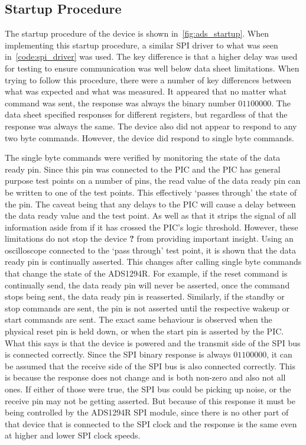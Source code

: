 \subsection{Startup Procedure}
The startup procedure of the device is shown in~\autoref{fig:ads_startup}.
When implementing this startup procedure, a similar SPI driver to what was seen in~\autoref{code:spi_driver} was used.
The key difference is that a higher delay was used for testing to ensure communication was well below data sheet limitations.
When trying to follow this procedure, there were a number of key differences between what was expected and what was measured.
It appeared that no matter what command was sent, the response was always the binary number \(01100000\).
The data sheet specified responses for different registers, but regardless of that the response was always the same.
The device also did not appear to respond to any two byte commands.
However, the device did respond to single byte commands.

The single byte commands were verified by monitoring the state of the data ready pin.
Since this pin was connected to the PIC and the PIC has general purpose test points on a number of pins,
the read value of the data ready pin can be written to one of the test points.
This effectively `passes through' the state of the pin.
The caveat being that any delays to the PIC will cause a delay between the data ready value and the test point.
As well as that it strips the signal of all information aside from if it has crossed the PIC's logic threshold.
However, these limitations do not stop the device \textbf{?} from providing important insight.
Using an oscilloscope connected to the `pass through' test point, it is shown that the data ready pin is continually asserted.
This changes after calling single byte commands that change the state of the ADS1294R.
For example, if the reset command is continually send, the data ready pin will never be asserted,
once the command stops being sent, the data ready pin is reasserted.
Similarly, if the standby or stop commands are sent, the pin is not asserted until the respective wakeup or start commands are sent.
The exact same behaviour is observed when the physical reset pin is held down, or when the start pin is asserted by the PIC.
What this says is that the device is powered and the transmit side of the SPI bus is connected correctly.
Since the SPI binary response is always \(01100000\), it can be assumed that the receive side of the SPI bus is also connected correctly.
This is because the response does not change and is both non-zero and also not all ones.
If either of those were true, the SPI bus could be picking up noise, or the receive pin may not be getting asserted.
But because of this response it must be being controlled by the ADS1294R SPI module,
since there is no other part of that device that is connected to the SPI clock and the response is the same even at higher and lower SPI clock speeds.

